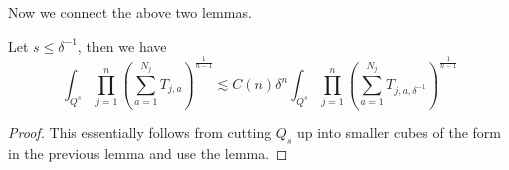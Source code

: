 Now we connect the above two lemmas.
\begin{proposition}
    Let $s\leq\delta^{-1}$, then we have
    \begin{equation*}
        \int_{Q^s}\prod_{j=1}^n\left(\sum_{a=1}^{N_j}T_{j,a}\right)^{\frac{1}{n-1}}\lesssim C(n)\delta^n\int_{Q^s}\prod_{j=1}^n\left(\sum_{a=1}^{N_j}T_{j,a,\delta^{-1}} \right)^{\frac{1}{n-1}}
    \end{equation*}
\end{proposition}
\begin{proof}
This essentially follows from cutting $Q_s$ up into smaller cubes of the form in the previous lemma and use the lemma. 

\end{proof}
